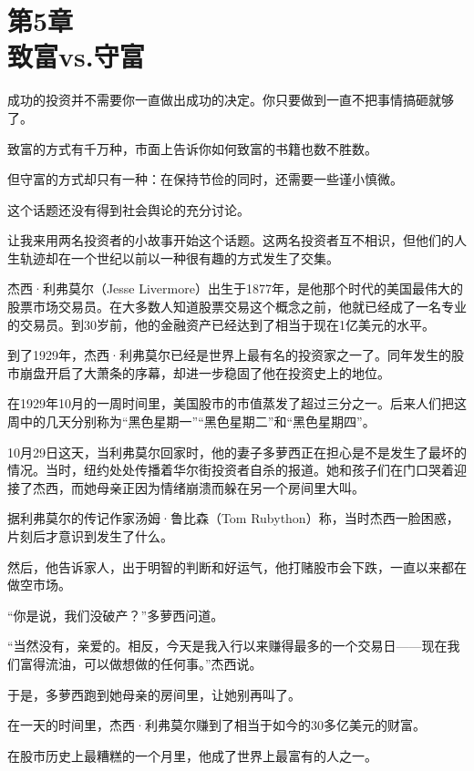 
\section[第5章\q 致富vs.守富]{第5章\\ 致富vs.守富}

{\kaishu

成功的投资并不需要你一直做出成功的决定。你只要做到一直不把事情搞砸就够了。

}

致富的方式有千万种，市面上告诉你如何致富的书籍也数不胜数。

但守富的方式却只有一种：在保持节俭的同时，还需要一些谨小慎微。

这个话题还没有得到社会舆论的充分讨论。

让我来用两名投资者的小故事开始这个话题。这两名投资者互不相识，但他们的人生轨迹却在一个世纪以前以一种很有趣的方式发生了交集。

杰西·利弗莫尔（Jesse Livermore）出生于1877年，是他那个时代的美国最伟大的股票市场交易员。在大多数人知道股票交易这个概念之前，他就已经成了一名专业的交易员。到30岁前，他的金融资产已经达到了相当于现在1亿美元的水平。

到了1929年，杰西·利弗莫尔已经是世界上最有名的投资家之一了。同年发生的股市崩盘开启了大萧条的序幕，却进一步稳固了他在投资史上的地位。

在1929年10月的一周时间里，美国股市的市值蒸发了超过三分之一。后来人们把这周中的几天分别称为“黑色星期一”“黑色星期二”和“黑色星期四”。

10月29日这天，当利弗莫尔回家时，他的妻子多萝西正在担心是不是发生了最坏的情况。当时，纽约处处传播着华尔街投资者自杀的报道。她和孩子们在门口哭着迎接了杰西，而她母亲正因为情绪崩溃而躲在另一个房间里大叫。

据利弗莫尔的传记作家汤姆·鲁比森（Tom Rubython）称，当时杰西一脸困惑，片刻后才意识到发生了什么。

然后，他告诉家人，出于明智的判断和好运气，他打赌股市会下跌，一直以来都在做空市场。

“你是说，我们没破产？”多萝西问道。

“当然没有，亲爱的。相反，今天是我入行以来赚得最多的一个交易日——现在我们富得流油，可以做想做的任何事。”杰西说。

于是，多萝西跑到她母亲的房间里，让她别再叫了。

在一天的时间里，杰西·利弗莫尔赚到了相当于如今的30多亿美元的财富。

在股市历史上最糟糕的一个月里，他成了世界上最富有的人之一。

